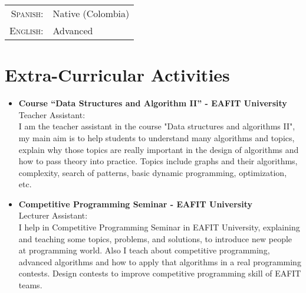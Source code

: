 \documentclass[a4paper,10pt]{article} %
\begin{document}
\begin{tabular}{rl}
\textsc{Spanish:} & Native (Colombia)\\
\textsc{English:} & Advanced \\
\end{tabular}


\section{Extra-Curricular Activities}
\begin{itemize}
\item \textbf{Course ``Data Structures and Algorithm II'' - EAFIT University}\\
Teacher Assistant:\\
I am the teacher assistant in the course "Data structures and algorithms II", my main aim is to help students to understand many algorithms and topics, explain why those topics are really important in the design of algorithms and how to pass theory into practice. Topics include graphs and their algorithms, complexity, search of patterns, basic dynamic programming, optimization, etc.\\
\item \textbf{Competitive Programming Seminar - EAFIT University}\\
Lecturer Assistant:\\
I help in Competitive Programming Seminar in EAFIT University, explaining and teaching some topics, problems, and solutions, to introduce new people at programming world. Also I teach about competitive programming, advanced algorithms and how to apply that algorithms in a real programming contests.
Design contests to improve competitive programming skill of EAFIT teams.
\end{itemize}

\end{document}
